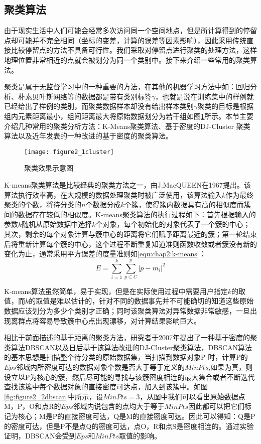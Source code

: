 \subsection{聚类算法}
由于现实生活中人们可能会经常多次访问同一个空间地点，但是所计算得到的停留点却可能并不完全相同（坐标的变差，计算的误差等因素影响），因此采用传统直接比较停留点的方法不具备可行性。我们采取对停留点进行聚类的处理方法，这样地理位置非常相近的点就会被划分为同一个类别中。接下来介绍一些常用的聚类算法。
\par 聚类是属于无监督学习中的一种重要的方法，在其他的机器学习方法中如：回归分析、朴素贝叶斯网络等的数据都是带有类别标签$\gamma$，也就是说在训练集中的样例就已经给出了样例的类别，而聚类数据样本却没有给出样本类别$\gamma$聚类的目标是根据组内元素距离最小，组间距离最大将原始数据划分为若干组如图\ref{figure2_1cluster}所示。本节主要介绍几种常用的聚类分析方法：K-Means聚类算法、基于密度的DJ-Cluster 聚类算法以及近年发表的一种改进的基于密度的聚类算法。
\begin{figure}[htp]
\centering
\texttt{[image: figure2\_1cluster]}
\caption{聚类效果示意图}
\label{figure2_1cluster}
\end{figure}
\par  K-means聚类算法是比较经典的聚类方法之一，由J.MacQUEEN在1967提出。该算法执行效率高，在大规模的数据处理聚类时被广泛使用，该算法输入$k$作为最终聚类的个数，将待分类的$n$个数据分成$k$个簇，使得簇内数据具有高的相似度而簇间的数据存在较低的相似度。K-means聚类算法的执行过程如下：首先根据输入的参数$k$随机从原始数据中选择$k$个对象，每个初始化的对象代表了一个簇的中心；其次，剩余的每个对象计算与簇中心的距离将它们赋予距离最近的簇；第一轮结束后将重新计算每个簇的中心，这个过程不断重复知道准则函数收敛或者簇没有新的变化为止，通常采用平方误差的度量准则如\ref{equ:chap2:k-means}：
\begin{equation}
\label{equ:chap2:k-means}
E=\sum_{i=1}^{k}\sum_{p\subset C}^{p}{\left | p-m_{i} \right |^{2}}
\end{equation}
\par K-means算法虽然简单，易于实现，但是在实际使用过程中需要用户指定$k$的取值，而$k$的取值是难以估计的，针对不同的数据事先并不可能确切的知道这些原始数据应该划分为多少个类别才正确；同时该聚类算法对异常数据非常敏感，一旦出现离群点将容易导致簇中心点出现漂移，对计算结果影响巨大。
\par 相比于前面描述的基于距离的聚类方法，研究者于2007年提出了一种基于密度的聚类算法DBSCAN以及日后基于该算法改进的DJ-Cluster聚类算法，DBSCAN算法的基本思想是扫描整个待分类的原始数据集，当扫描到数据对象P 时，计算P的$Eps$邻域内所密度可达的数据对象个数是否大于等于定义的$MinPts$,如果为真，则设立以P为核心的簇，然后尽可能的寻找与该簇密度相连的最大集合或者不断迭代查找该簇中每个数据对象的直接密度可达点，加入到该簇中。如图\ref{fig:figure2_2dbscan}中所示，设$MinPts=3$，从图中我们可以看出原始数据点M，P，O和点R的$Eps$邻域内说包含的点均大于等于$MinPts$因此都可以把它们标记为核心；M是P的直接密度可达，Q是M的直接密度可达。因此可以得知：Q是P的密度可达，但是P不是点Q的密度可达，点O，R和点S是密度相连的。通过实验证明，DBSCAN会受到$Eps$和$MinPts$取值的影响。
